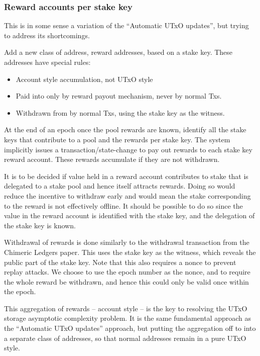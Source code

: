 \documentclass[11pt,a4paper]{article}
\begin{document}
\subsubsection{Reward accounts per stake key}
\label{reward-accounts-per-stake-key}

This is in some sense a variation of the ``Automatic UTxO updates'', but
trying to address its shortcomings.

Add a new class of address, reward addresses, based on a stake key.
These addresses have special rules:

\begin{itemize}
\item
  Account style accumulation, not UTxO style
\item
  Paid into only by reward payout mechanism, never by normal Txs.
\item
  Withdrawn from by normal Txs, using the stake key as the witness.
\end{itemize}

At the end of an epoch once the pool rewards are known, identify all the
stake keys that contribute to a pool and the rewards per stake key. The
system implicitly issues a transaction/state-change to pay out rewards
to each stake key reward account. These rewards accumulate if they are
not withdrawn.

It is to be decided if value held in a reward account contributes to
stake that is delegated to a stake pool and hence itself attracts
rewards. Doing so would reduce the incentive to withdraw early and would
mean the stake corresponding to the reward is not effectively offline.
It should be possible to do so since the value in the reward account is
identified with the stake key, and the delegation of the stake key is
known.

Withdrawal of rewards is done similarly to the withdrawal transaction from the
Chimeric Ledgers paper. This uses the stake key as the witness, which reveals
the public part of the stake key. Note that this also requires a nonce to
prevent replay attacks. We choose to use the epoch number as the nonce, and to
require the whole reward be withdrawn, and hence this could only be valid once
within the epoch.

This aggregation of rewards -- account style -- is the key to resolving
the UTxO storage asymptotic complexity problem. It is the same
fundamental approach as the ``Automatic UTxO updates'' approach, but
putting the aggregation off to into a separate class of addresses, so
that normal addresses remain in a pure UTxO style.
\end{document}
